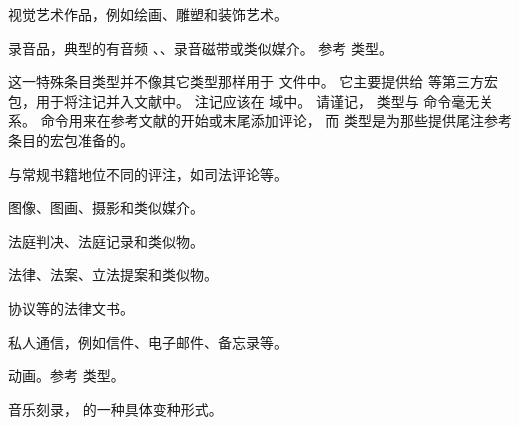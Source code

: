 \begin{typelist}

视觉艺术作品，例如绘画、雕塑和装饰艺术。

录音品，典型的有音频 、、录音磁带或类似媒介。
参考  类型。

这一特殊条目类型并不像其它类型那样用于  文件中。
它主要提供给  等第三方宏包，用于将注记并入文献中。
注记应该在  域中。
请谨记， 类型与  命令毫无关系。
 命令用来在参考文献的开始或末尾添加评论，
而  类型是为那些提供尾注参考条目的宏包准备的。

与常规书籍地位不同的评注，如司法评论等。

图像、图画、摄影和类似媒介。

法庭判决、法庭记录和类似物。

法律、法案、立法提案和类似物。

协议等的法律文书。

私人通信，例如信件、电子邮件、备忘录等。

动画。参考  类型。

音乐刻录， 的一种具体变种形式。


\end{typelist}

